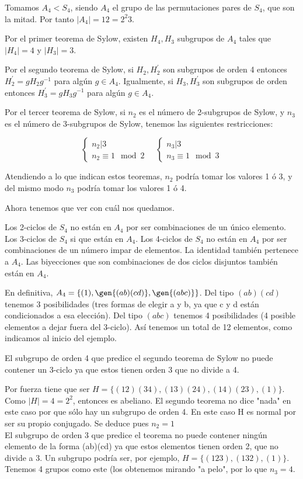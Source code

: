 \documentclass[nochap]{apuntes}
\begin{document}
\begin{example}
 Tomamos $A_4<S_4$, siendo $A_4$  el grupo de las permutaciones pares de $S_4$, que son la mitad. Por tanto $|A_4|=12=2^{2}3$.

 Por el primer teorema de Sylow, existen $H_4, H_3$  subgrupos de $A_4$  tales que $|H_4|=4$ y $|H_3|=3$.

 Por el segundo teorema de Sylow, si $H_2, H_2^{'}$  son subgrupos de orden 4 entonces $H_2^{'}=gH_2g^{-1}$  para algún $g\in A_4$. Igualmente, si $H_3, H_3^{'}$  son subgrupos de orden entonces $H_3^{'}=gH_3g^{-1}$  para algún $g\in A_4$.

 Por el tercer teorema de Sylow, si $n_2$ es el número de 2-subgrupos de Sylow, y $n_3$ es el número de 3-subgrupos de Sylow, tenemos las siguientes restricciones:

 \[ \begin{cases} n_2 | 3 \\ n_2 \equiv 1\mod 2 \end{cases}\quad
 \begin{cases} n_3 | 3 \\ n_3 \equiv 1 \mod 3\end{cases} \]

 Atendiendo a lo que indican estos teoremas, $n_2$  podría tomar los valores 1 ó 3, y del mismo modo $n_3$  podría tomar los valores 1 ó 4.

 Ahora tenemos que ver con cuál nos quedamos.

 Los 2-ciclos de $S_4$  no están en $A_4$  por ser combinaciones de un único elemento. Los 3-ciclos de $S_4$  si que están en $A_4$. Los 4-ciclos de $S_4$  no están en $A_4$  por ser combinaciones de un número impar de elementos.  La identidad también pertenece a $A_4$. Las biyecciones que son combinaciones de dos ciclos disjuntos también están en $A_4$.

 En definitiva, $A_4=\{(1), \gen{(ab)(cd)}, \gen{(abc)}\}$. Del tipo $(ab)(cd)$ tenemos 3 posibilidades (tres formas de elegir a y b, ya que c y d
 están condicionados a esa elección). Del tipo $(abc)$ tenemos 4 posibilidades (4 posible elementos a dejar fuera del 3-ciclo). Así tenemos un total de 12 elementos, como indicamos al inicio del ejemplo.

 El subgrupo de orden 4 que predice el segundo teorema de Sylow no puede contener un 3-ciclo ya que estos tienen orden 3 que no divide
 a 4.

 Por fuerza tiene que ser $H=\{(12)(34), (13)(24), (14)(23), (1)\}$. Como $|H|=4=2^{2}$, entonces es abeliano.
 El segundo teorema no dice "nada" en este caso por que sólo hay un subgrupo de orden 4. En este caso H es normal por ser su propio
 conjugado. Se deduce pues $n_2=1$\\

 El subgrupo de orden 3 que predice el teorema no puede contener ningún elemento de la forma (ab)(cd) ya que estos elementos tienen
 orden 2, que no divide a 3. Un subgrupo podría ser, por ejemplo, $H=\{(123),(132),(1)\}$. Tenemos 4 grupos como este (los obtenemos mirando "a pelo", por lo que $n_3=4$.
 \end{example}
\end{document}
